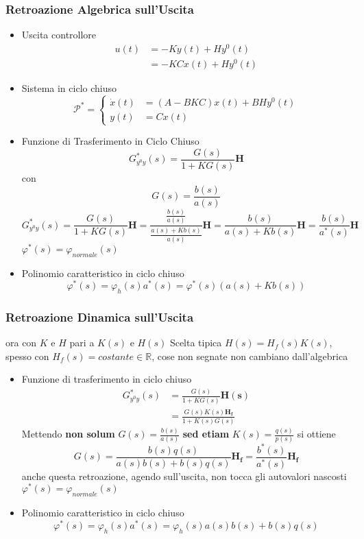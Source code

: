 \documentclass{article}
\begin{document}
\subsubsection{Retroazione Algebrica sull'Uscita}
\begin{itemize}
\item Uscita controllore
  \begin{align*}
    u(t) &= -Ky(t) + H y^0 (t) \\
    &= -KCx(t) + Hy^0 (t)
  \end{align*}
\item Sistema in ciclo chiuso
  \[ \mathcal{P}^{\ast} = \begin{cases}
    \dot{x}(t) &= (A-BKC)x(t) + BHy^0 (t) \\
    y(t) &= Cx(t)
  \end{cases} \]
\item Funzione di Trasferimento in Ciclo Chiuso
  \[ G^{\ast} _{y^0 y} (s) = \frac{G(s)}{1+ KG(s)} \mathbf{H}\]
  con
  \[ G(s) = \frac{b(s)}{a(s)} \]
  \[ G^{\ast} _{y^0 y} (s)
  = \frac{G(s)}{1+KG(s)} \mathbf{H}
  = \frac{\frac{b(s)}{a(s)}}{\frac{a(s) + Kb(s)}{a(s)}} \mathbf{H}
  = \frac{b(s)}{a(s) + Kb(s)} \mathbf{H}
  = \frac{b(s)}{a^{\ast}(s)} \mathbf{H}\]
  $\varphi ^{\ast} (s) = \varphi_{normale} (s)$
\item Polinomio caratteristico in ciclo chiuso
  \[ \varphi ^{\ast} (s) = \varphi_{h} (s) a^{\ast} (s)
  = \varphi ^{\ast} (s) (a(s) + Kb(s)) \]
\end{itemize}

\subsubsection{Retroazione Dinamica sull'Uscita}
ora con $K$ e $H$ pari a $K(s)$ e $H(s)$
Scelta tipica $H(s) = H_f (s) K(s)$, spesso con
$H_f (s) = costante \in \mathbb{R}$, cose non segnate non cambiano
dall'algebrica

\begin{itemize}
\item Funzione di trasferimento in ciclo chiuso
  \begin{align*}
    G^{\ast} _{y^0 y}(s) &= \frac{G(s)}{1 + KG(s)} \mathbf{H(s)} \\
    &= \frac{G(s)K(s) \mathbf{H_f}}{1 + K(s)G(s)}
  \end{align*}
  Mettendo \textbf{non solum}
  $G(s) = \frac{b(s)}{a(s)}$ \textbf{sed etiam}
  $K(s) = \frac{q(s)}{p(s)}$ si ottiene
  \[ G(s) = \frac{b(s)q(s)}{a(s)b(s) + b(s)q(s)} \mathbf{H_f} =
  \frac{b^{\ast}(s)}{a^{\ast}(s)} \mathbf{H_f} \]
  anche questa retroazione, agendo sull'uscita, non tocca gli autovalori nascosti
  $\varphi ^{\ast} (s) = \varphi_{normale} (s)$
\item Polinomio caratteristico in ciclo chiuso
  \[ \varphi ^{\ast} (s) = \varphi_h (s) a^{\ast} (s)
  = \varphi _h (s) a(s)b(s) + b(s)q(s) \]
\end{itemize}
\end{document}

